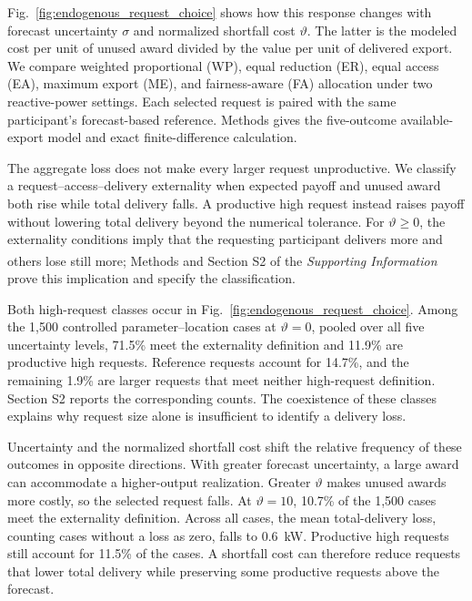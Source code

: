 \documentclass[twoside,twocolumn,9pt]{article}
\newcommand{\suppref}{\textit{Supporting Information}\textsuperscript{\dag}}
\begin{document}
Fig.~\ref{fig:endogenous_request_choice} shows how this response changes with
forecast uncertainty $\sigma$ and normalized shortfall cost $\vartheta$.
The latter is the modeled cost per unit of unused award divided by the value
per unit of delivered export. We compare weighted proportional (WP), equal
reduction (ER), equal access (EA), maximum export (ME), and fairness-aware (FA)
allocation under two reactive-power settings. Each selected request is paired
with the same participant's forecast-based reference. Methods gives the
five-outcome available-export model and exact finite-difference calculation.

The aggregate loss does not make every larger request unproductive. We classify
a request--access--delivery externality when expected payoff and unused award
both rise while total delivery falls. A productive high request instead raises
payoff without lowering total delivery beyond the numerical tolerance. For
$\vartheta\ge0$, the externality conditions imply that the requesting
participant delivers more and others lose still more; Methods and Section S2
of the \suppref{} prove this implication and specify the classification.

Both high-request classes occur in Fig.~\ref{fig:endogenous_request_choice}.
Among the 1,500 controlled parameter--location cases at $\vartheta=0$, pooled
over all five uncertainty levels, 71.5\% meet the
externality definition and 11.9\% are productive high requests. Reference
requests account for 14.7\%, and the remaining 1.9\% are larger requests that
meet neither high-request definition. Section S2 reports the corresponding
counts. The coexistence of these classes explains why request size alone is
insufficient to identify a delivery loss.

Uncertainty and the normalized shortfall cost shift the relative frequency of
these outcomes in opposite directions. With greater forecast uncertainty, a
large award can accommodate a higher-output realization. Greater $\vartheta$ makes
unused awards more costly, so the selected request falls. At $\vartheta=10$,
10.7\% of the 1,500 cases meet the externality definition. Across all cases, the
mean total-delivery loss, counting cases without a loss as zero, falls to
0.6~kW. Productive high requests still account for 11.5\% of the cases. A
shortfall cost can therefore reduce requests that lower total delivery while
preserving some productive requests above the forecast.
\end{document}
